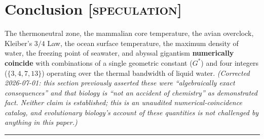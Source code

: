 \documentclass[11pt, letterpaper]{article}
\newcommand{\G}{G^*}
\theoremstyle{definition}
\theoremstyle{remark}
\begin{document}
\section{Conclusion \textnormal{[\textsc{speculation}]}}

The thermoneutral zone, the mammalian core temperature, the avian overclock, Kleiber's $3/4$ Law, the ocean surface temperature, the maximum density of water, the freezing point of seawater, and abyssal gigantism \textbf{numerically coincide} with combinations of a single geometric constant ($\G$) and four integers ($\{3, 4, 7, 13\}$) operating over the thermal bandwidth of liquid water. \textit{(Corrected 2026-07-01: this section previously asserted these were ``algebraically exact consequences'' and that biology is ``not an accident of chemistry'' as demonstrated fact. Neither claim is established; this is an unaudited numerical-coincidence catalog, and evolutionary biology's account of these quantities is not challenged by anything in this paper.)}

\vspace{2em}
\hrule
\vspace{1.5em}
\end{document}
